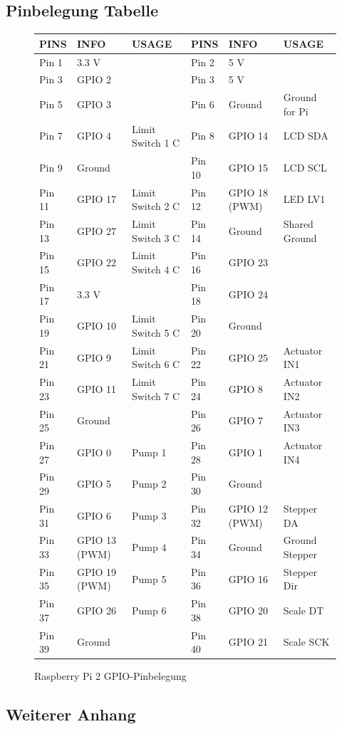\subsection{Pinbelegung Tabelle}
\newpage
\begin{figure}[H]
  \footnotesize
  \begin{tabularx}{\textwidth}{|l|X|X|l|X|X|}
    \hline
    \textbf{PINS} & \textbf{INFO} & \textbf{USAGE} & \textbf{PINS} & \textbf{INFO} & \textbf{USAGE} \\
    \hline
    Pin 1 & 3.3 V & & Pin 2 & 5 V & \\
    \hline
    Pin 3 & GPIO 2 & & Pin 3 & 5 V & \\
    \hline
    Pin 5 & GPIO 3 & & Pin 6 & Ground & Ground for Pi \\
    \hline
    Pin 7 & GPIO 4 & Limit Switch 1 C & Pin 8 & GPIO 14 & LCD SDA \\
    \hline
    Pin 9 & Ground & & Pin 10 & GPIO 15 & LCD SCL \\
    \hline
    Pin 11 & GPIO 17 & Limit Switch 2 C & Pin 12 & GPIO 18 (PWM) & LED LV1 \\
    \hline
    Pin 13 & GPIO 27 & Limit Switch 3 C & Pin 14 & Ground & Shared Ground \\
    \hline
    Pin 15 & GPIO 22 & Limit Switch 4 C & Pin 16 & GPIO 23 & \\
    \hline
    Pin 17 & 3.3 V & & Pin 18 & GPIO 24 & \\
    \hline
    Pin 19 & GPIO 10 & Limit Switch 5 C & Pin 20 & Ground & \\
    \hline
    Pin 21 & GPIO 9 & Limit Switch 6 C & Pin 22 & GPIO 25 & Actuator IN1 \\
    \hline
    Pin 23 & GPIO 11 & Limit Switch 7 C & Pin 24 & GPIO 8 & Actuator IN2 \\
    \hline
    Pin 25 & Ground & & Pin 26 & GPIO 7 & Actuator IN3 \\
    \hline
    Pin 27 & GPIO 0 & Pump 1 & Pin 28 & GPIO 1 & Actuator IN4 \\
    \hline
    Pin 29 & GPIO 5 & Pump 2 & Pin 30 & Ground & \\
    \hline
    Pin 31 & GPIO 6 & Pump 3 & Pin 32 & GPIO 12 (PWM) & Stepper DA \\
    \hline
    Pin 33 & GPIO 13 (PWM) & Pump 4 & Pin 34 & Ground & Ground Stepper \\
    \hline
    Pin 35 & GPIO 19 (PWM) & Pump 5 & Pin 36 & GPIO 16 & Stepper Dir \\
    \hline
    Pin 37 & GPIO 26 & Pump 6 & Pin 38 & GPIO 20 & Scale DT \\
    \hline
    Pin 39 & Ground & & Pin 40 & GPIO 21 & Scale SCK \\
    \hline
  \end{tabularx}
  \normalsize
  \caption{Raspberry Pi 2 GPIO-Pinbelegung}
  \label{fig:raspberry_pi_pinout_tabularx}
\end{figure}
  
\newpage
\subsection{Weiterer Anhang}

